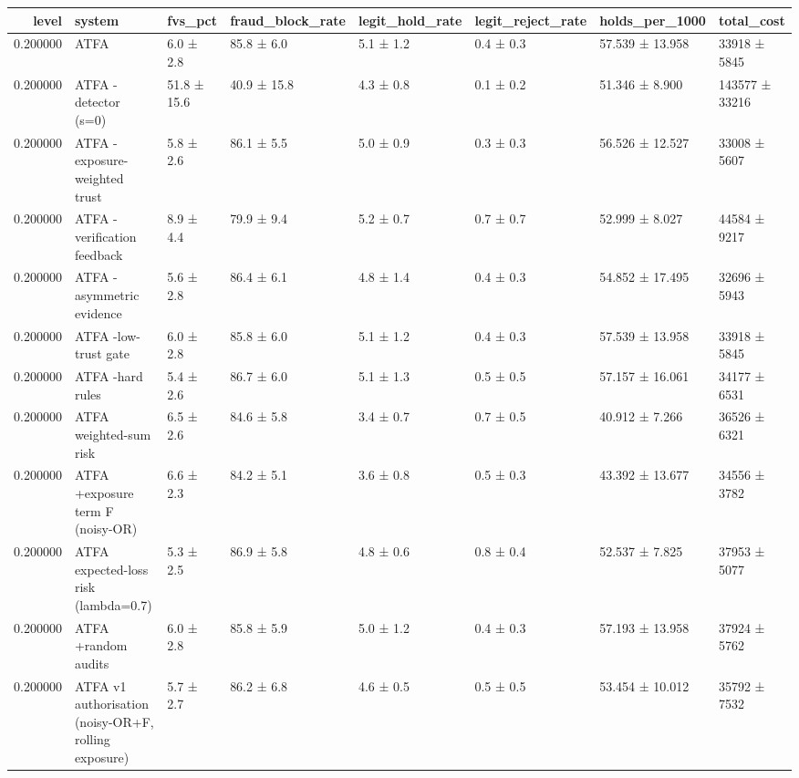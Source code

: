 \begin{tabular}{rlllllll}
\toprule
level & system & fvs\_pct & fraud\_block\_rate & legit\_hold\_rate & legit\_reject\_rate & holds\_per\_1000 & total\_cost \\
\midrule
0.200000 & ATFA & 6.0 ± 2.8 & 85.8 ± 6.0 & 5.1 ± 1.2 & 0.4 ± 0.3 & 57.539 ± 13.958 & 33918 ± 5845 \\
0.200000 & ATFA -detector (s=0) & 51.8 ± 15.6 & 40.9 ± 15.8 & 4.3 ± 0.8 & 0.1 ± 0.2 & 51.346 ± 8.900 & 143577 ± 33216 \\
0.200000 & ATFA -exposure-weighted trust & 5.8 ± 2.6 & 86.1 ± 5.5 & 5.0 ± 0.9 & 0.3 ± 0.3 & 56.526 ± 12.527 & 33008 ± 5607 \\
0.200000 & ATFA -verification feedback & 8.9 ± 4.4 & 79.9 ± 9.4 & 5.2 ± 0.7 & 0.7 ± 0.7 & 52.999 ± 8.027 & 44584 ± 9217 \\
0.200000 & ATFA -asymmetric evidence & 5.6 ± 2.8 & 86.4 ± 6.1 & 4.8 ± 1.4 & 0.4 ± 0.3 & 54.852 ± 17.495 & 32696 ± 5943 \\
0.200000 & ATFA -low-trust gate & 6.0 ± 2.8 & 85.8 ± 6.0 & 5.1 ± 1.2 & 0.4 ± 0.3 & 57.539 ± 13.958 & 33918 ± 5845 \\
0.200000 & ATFA -hard rules & 5.4 ± 2.6 & 86.7 ± 6.0 & 5.1 ± 1.3 & 0.5 ± 0.5 & 57.157 ± 16.061 & 34177 ± 6531 \\
0.200000 & ATFA weighted-sum risk & 6.5 ± 2.6 & 84.6 ± 5.8 & 3.4 ± 0.7 & 0.7 ± 0.5 & 40.912 ± 7.266 & 36526 ± 6321 \\
0.200000 & ATFA +exposure term F (noisy-OR) & 6.6 ± 2.3 & 84.2 ± 5.1 & 3.6 ± 0.8 & 0.5 ± 0.3 & 43.392 ± 13.677 & 34556 ± 3782 \\
0.200000 & ATFA expected-loss risk (lambda=0.7) & 5.3 ± 2.5 & 86.9 ± 5.8 & 4.8 ± 0.6 & 0.8 ± 0.4 & 52.537 ± 7.825 & 37953 ± 5077 \\
0.200000 & ATFA +random audits & 6.0 ± 2.8 & 85.8 ± 5.9 & 5.0 ± 1.2 & 0.4 ± 0.3 & 57.193 ± 13.958 & 37924 ± 5762 \\
0.200000 & ATFA v1 authorisation (noisy-OR+F, rolling exposure) & 5.7 ± 2.7 & 86.2 ± 6.8 & 4.6 ± 0.5 & 0.5 ± 0.5 & 53.454 ± 10.012 & 35792 ± 7532 \\
\bottomrule
\end{tabular}
